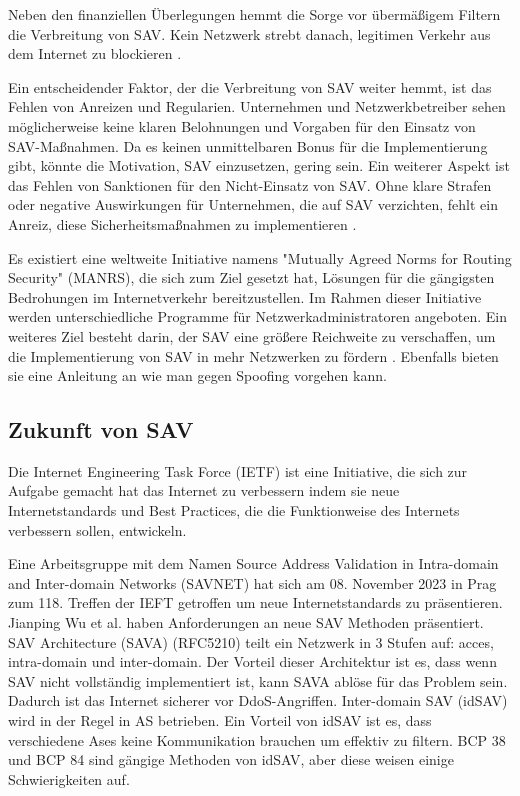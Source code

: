 \documentclass[sigplan,screen]{acmart}
\begin{document}
Neben den finanziellen Überlegungen hemmt die Sorge vor übermäßigem Filtern die Verbreitung von SAV. Kein Netzwerk strebt danach, legitimen Verkehr aus dem Internet zu blockieren \cite{FrontDoor01}.

Ein entscheidender Faktor, der die Verbreitung von SAV weiter hemmt, ist das Fehlen von Anreizen und Regularien. Unternehmen und Netzwerkbetreiber sehen möglicherweise keine klaren Belohnungen und Vorgaben für den Einsatz von SAV-Maßnahmen. Da es keinen unmittelbaren Bonus für die Implementierung gibt, könnte die Motivation, SAV einzusetzen, gering sein. Ein weiterer Aspekt ist das Fehlen von Sanktionen für den Nicht-Einsatz von SAV. Ohne klare Strafen oder negative Auswirkungen für Unternehmen, die auf SAV verzichten, fehlt ein Anreiz, diese Sicherheitsmaßnahmen zu implementieren \cite{Lone01}.

Es existiert eine weltweite Initiative namens "Mutually Agreed Norms for Routing Security" (MANRS), die sich zum Ziel gesetzt hat, Lösungen für die gängigsten Bedrohungen im Internetverkehr bereitzustellen. Im Rahmen dieser Initiative werden unterschiedliche Programme für Netzwerkadministratoren angeboten. Ein weiteres Ziel besteht darin, der SAV eine größere Reichweite zu verschaffen, um die Implementierung von SAV in mehr  Netzwerken zu fördern \cite{manrs01}. Ebenfalls bieten sie eine Anleitung \cite{anti-spoofing01} an wie man gegen Spoofing vorgehen kann.

\subsection{Zukunft von SAV}

Die Internet Engineering Task Force (IETF) ist eine Initiative, die sich zur Aufgabe gemacht hat das Internet zu verbessern indem sie neue Internetstandards und Best Practices, die die Funktionweise des Internets verbessern sollen, entwickeln.

Eine Arbeitsgruppe mit dem Namen Source Address Validation in Intra-domain and Inter-domain Networks (SAVNET) hat sich am 08. November 2023 in Prag zum 118. Treffen der IEFT getroffen um neue Internetstandards zu präsentieren. 
Jianping Wu et al. \cite{SAV_requirements01} haben Anforderungen an neue SAV Methoden präsentiert. SAV Architecture (SAVA) (RFC5210) teilt ein Netzwerk in 3 Stufen auf: acces, intra-domain und inter-domain. Der Vorteil dieser Architektur ist es, dass wenn SAV nicht vollständig implementiert ist, kann SAVA ablöse für das Problem sein. Dadurch ist das Internet sicherer vor DdoS-Angriffen. Inter-domain SAV (idSAV) wird in der Regel in AS betrieben. Ein Vorteil von idSAV ist es, dass verschiedene Ases keine Kommunikation brauchen um effektiv zu filtern.  BCP 38 und BCP 84 sind gängige Methoden von idSAV, aber diese weisen einige Schwierigkeiten auf. 




\appendix
\end{document}
